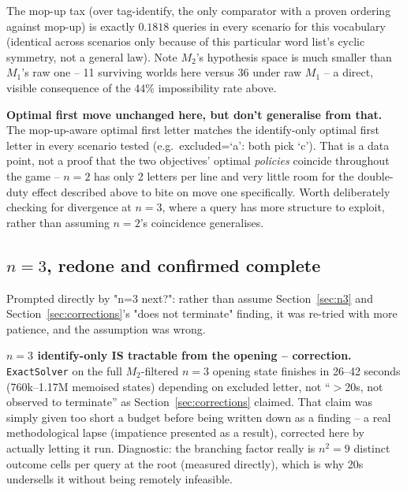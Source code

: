 \documentclass[11pt]{article}
\begin{document}
The mop-up tax (over tag-identify, the only comparator with a proven
ordering against mop-up) is exactly $0.1818$ queries in every scenario for
this vocabulary (identical across scenarios only because of this particular
word list's cyclic symmetry, not a general law). Note $M_2$'s hypothesis
space is much smaller than $M_1$'s raw one -- 11 surviving worlds here
versus 36 under raw $M_1$ -- a direct, visible consequence of the 44\%
impossibility rate above.

\textbf{Optimal first move unchanged here, but don't generalise from
that.} The mop-up-aware optimal first letter matches the identify-only
optimal first letter in every scenario tested (e.g.\ excluded=`a': both
pick `c'). That is a data point, not a proof that the two objectives'
optimal \emph{policies} coincide throughout the game -- $n=2$ has only 2
letters per line and very little room for the double-duty effect
described above to bite on move one specifically. Worth deliberately
checking for divergence at $n=3$, where a query has more structure to
exploit, rather than assuming $n=2$'s coincidence generalises.

\subsection{$n=3$, redone and confirmed complete}
\label{sec:n3-redo}

Prompted directly by "n=3 next?": rather than assume Section~\ref{sec:n3}
and Section~\ref{sec:corrections}'s "does not terminate" finding, it was
re-tried with more patience, and the assumption was wrong.

\textbf{$n=3$ identify-only IS tractable from the opening -- correction.}
\texttt{ExactSolver} on the full $M_2$-filtered $n=3$ opening state
finishes in 26--42 seconds (760k--1.17M memoised states) depending on
excluded letter, not ``$>$20s, not observed to terminate'' as
Section~\ref{sec:corrections} claimed. That claim was simply given too
short a budget before being written down as a finding -- a real
methodological lapse (impatience presented as a result), corrected here
by actually letting it run. Diagnostic: the branching factor really is
$n^2=9$ distinct outcome cells per query at the root (measured directly),
which is why 20s undersells it without being remotely infeasible.
\end{document}
